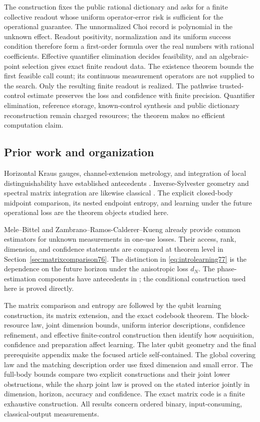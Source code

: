 The construction fixes the public rational dictionary and asks for
a finite collective readout whose uniform operator-error risk is
sufficient for the operational guarantee.  The unnormalized Choi
record is polynomial in the unknown effect.  Readout positivity,
normalization and its uniform success condition therefore form a
first-order formula over the real numbers with rational coefficients.
Effective quantifier elimination decides feasibility, and an
algebraic-point selection gives exact finite readout data.
The existence theorem bounds the first feasible call count; its
continuous measurement operators are not supplied to the search.
Only the resulting finite readout is realized.  The pathwise
trusted-control estimate preserves the loss and confidence with
finite precision.  Quantifier elimination, reference storage,
known-control synthesis and public dictionary reconstruction remain
charged resources; the theorem makes no efficient computation claim.

\subsection{Prior work and organization}
Horizontal Kraus gauges, channel-extension metrology, and integration
of local distinguishability have established antecedents
\cite{FI76,DKG67,DM76,KGAD76,YF76,SD76}.
Inverse-Sylvester geometry and spectral matrix integration are likewise
classical \cite{Dittmann76,SZGeom76}. The explicit closed-body
midpoint comparison, its nested endpoint entropy, and learning under
the future operational loss are the theorem objects studied here.

Mele--Bittel \cite{MB67} and
Zambrano--Ramos-Calderer--Kueng \cite{ZRK76} already provide common
estimators for unknown measurements in one-use losses. Their access,
rank, dimension, and confidence statements are compared at theorem
level in Section~\ref{sec:matrixcomparison76}. The distinction in
\eqref{eq:introlearning77} is the dependence on the future horizon
under the anisotropic loss $d_N$. The phase-estimation components
have antecedents in \cite{HB76,KLY76}; the conditional construction
used here is proved directly.

The matrix comparison and entropy are followed by the qubit learning
construction, its matrix extension, and the exact codebook theorem.
The block-resource law, joint dimension bounds, uniform interior descriptions,
confidence refinement, and effective finite-control construction then identify
how acquisition, confidence and preparation affect learning. The later qubit geometry and the final prerequisite
appendix make the focused article self-contained. The global covering law and the matching description order use fixed
dimension and small error.  The full-body bounds compare two explicit
constructions and their joint lower obstructions, while the sharp joint law is
proved on the stated interior jointly in dimension, horizon, accuracy and confidence.  The exact matrix
code is a finite exhaustive construction.  All results concern ordered
binary, input-consuming, classical-output measurements.
